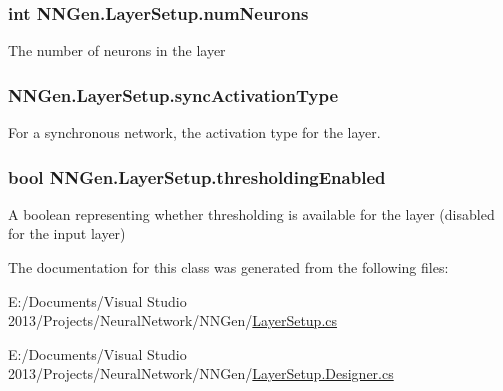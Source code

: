 \subsubsection[{num\+Neurons}]{\setlength{\rightskip}{0pt plus 5cm}int N\+N\+Gen.\+Layer\+Setup.\+num\+Neurons\hspace{0.3cm}{\ttfamily [get]}}\label{class_n_n_gen_1_1_layer_setup_ad02db2fa93e561ffd181ad7824d6b296}


The number of neurons in the layer 

\hypertarget{class_n_n_gen_1_1_layer_setup_a305c28b6f6a27e7f729362e63280e997}{}
\subsubsection[{sync\+Activation\+Type}]{ N\+N\+Gen.\+Layer\+Setup.\+sync\+Activation\+Type\hspace{0.3cm}{\ttfamily [get]}}\label{class_n_n_gen_1_1_layer_setup_a305c28b6f6a27e7f729362e63280e997}


For a synchronous network, the activation type for the layer. 

\hypertarget{class_n_n_gen_1_1_layer_setup_a8b5e8dd32a59d8ebb4956e3ddb6220b8}{}
\subsubsection[{thresholding\+Enabled}]{\setlength{\rightskip}{0pt plus 5cm}bool N\+N\+Gen.\+Layer\+Setup.\+thresholding\+Enabled\hspace{0.3cm}{\ttfamily [get]}}\label{class_n_n_gen_1_1_layer_setup_a8b5e8dd32a59d8ebb4956e3ddb6220b8}


A boolean representing whether thresholding is available for the layer (disabled for the input layer) 



The documentation for this class was generated from the following files\+:\begin{DoxyCompactItemize}
\item 
E\+:/\+Documents/\+Visual Studio 2013/\+Projects/\+Neural\+Network/\+N\+N\+Gen/\hyperlink{_layer_setup_8cs}{Layer\+Setup.\+cs}\item 
E\+:/\+Documents/\+Visual Studio 2013/\+Projects/\+Neural\+Network/\+N\+N\+Gen/\hyperlink{_layer_setup_8_designer_8cs}{Layer\+Setup.\+Designer.\+cs}\end{DoxyCompactItemize}
